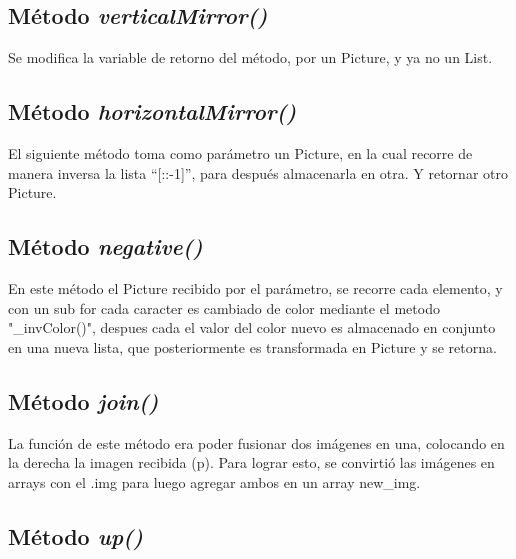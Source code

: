 \documentclass{article}
\begin{document}
	\subsection{Método \textit{verticalMirror()}}
	Se modifica la variable de retorno del método, por un Picture, y ya no un List.
		
	
		
	\subsection{Método \textit{horizontalMirror()}}
		
	El siguiente método toma como parámetro un Picture, en la cual recorre de manera inversa la lista “[::-1]”, para después almacenarla en otra. Y retornar otro Picture.
		
	
		
	\subsection{Método \textit{negative()}}
	
	En este método el Picture recibido por el parámetro, se recorre cada elemento, y con un sub for cada caracter es cambiado de color mediante el metodo "\_invColor()", despues cada el valor del color nuevo es almacenado en conjunto en una nueva lista, que posteriormente es transformada en Picture y se retorna.
	
	
	
	\subsection{Método \textit{join()}}
	
	La función de este método era poder fusionar dos imágenes en una, colocando en la derecha la imagen recibida (p). Para lograr esto,  se convirtió las imágenes en arrays con el .img para luego agregar ambos en un array new\_img.
	
	
	
	\subsection{Método \textit{up()}}
	
\end{document}
